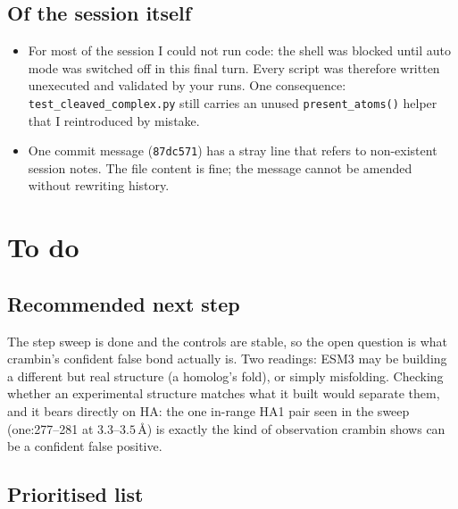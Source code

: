 \documentclass[11pt,a4paper]{article}
\newcommand{\ang}{\,\mbox{\AA}}
\begin{document}
\subsection{Of the session itself}

\begin{itemize}
\item For most of the session I could not run code: the shell was blocked
  until auto mode was switched off in this final turn. Every script was
  therefore written unexecuted and validated by your runs. One consequence:
  \texttt{test\_cleaved\_complex.py} still carries an unused
  \texttt{present\_atoms()} helper that I reintroduced by mistake.
\item One commit message (\texttt{87dc571}) has a stray line that refers to
  non-existent session notes. The file content is fine; the message cannot be
  amended without rewriting history.
\end{itemize}

\section{To do}

\subsection{Recommended next step}

The step sweep is done and the controls are stable, so the open question is what
crambin's confident false bond actually is. Two readings: ESM3 may be building a
different but real structure (a homolog's fold), or simply misfolding. Checking
whether an experimental structure matches what it built would separate them, and
it bears directly on HA: the one in-range HA1 pair seen in the sweep
(one:277--281 at $3.3$--$3.5\ang$) is exactly the kind of observation crambin
shows can be a confident false positive.

\subsection{Prioritised list}
\end{document}
